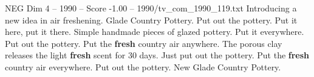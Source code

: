 \begin{textsample}{NEG Dim 4 – 1990 – Score -1.00 – 1990/tv\_com\_1990\_119.txt}  \label{ex:f4_neg_074}
Introducing a new idea in air freshening.
Glade Country Pottery.
Put out the pottery.
Put it here, put it there.
Simple handmade pieces of glazed pottery.
Put it everywhere.
Put out the pottery.
Put the \textbf{fresh} country air anywhere.
The porous clay releases the light \textbf{fresh} scent for 30 days.
Just put out the pottery.
Put the \textbf{fresh} country air everywhere.
Put out the pottery.
New Glade Country Pottery.

\end{textsample}
